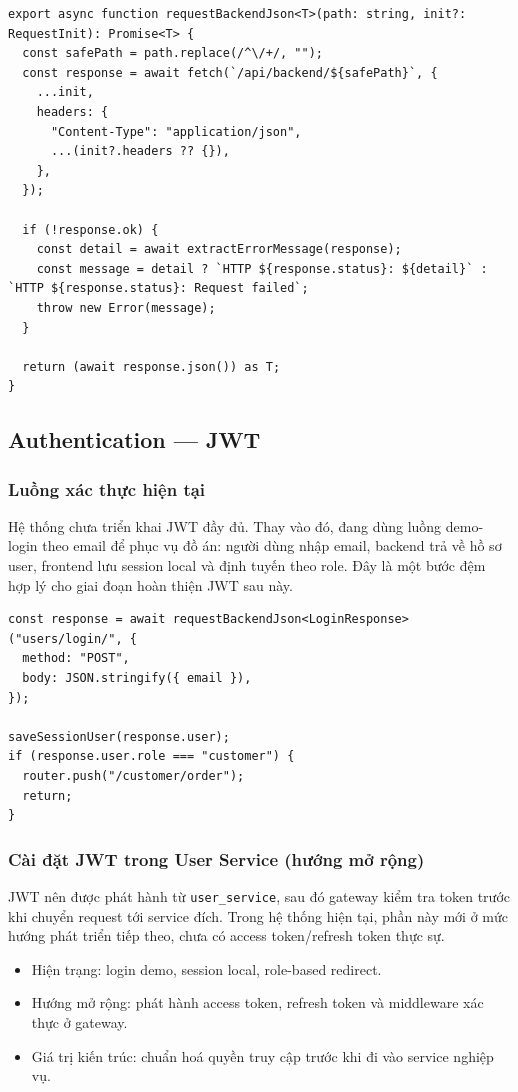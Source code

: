 \documentclass[12pt,a4paper]{article}
\begin{document}
\begin{lstlisting}[style=code,caption={Helper gọi backend từ frontend}]
export async function requestBackendJson<T>(path: string, init?: RequestInit): Promise<T> {
  const safePath = path.replace(/^\/+/, "");
  const response = await fetch(`/api/backend/${safePath}`, {
    ...init,
    headers: {
      "Content-Type": "application/json",
      ...(init?.headers ?? {}),
    },
  });

  if (!response.ok) {
    const detail = await extractErrorMessage(response);
    const message = detail ? `HTTP ${response.status}: ${detail}` : `HTTP ${response.status}: Request failed`;
    throw new Error(message);
  }

  return (await response.json()) as T;
}
\end{lstlisting}

\subsection{Authentication --- JWT}
\subsubsection{Luồng xác thực hiện tại}
Hệ thống chưa triển khai JWT đầy đủ. Thay vào đó, đang dùng luồng demo-login theo email để phục vụ đồ án: người dùng nhập email, backend trả về hồ sơ user, frontend lưu session local và định tuyến theo role. Đây là một bước đệm hợp lý cho giai đoạn hoàn thiện JWT sau này.

\begin{lstlisting}[style=code,caption={Luồng login demo theo email ở frontend}]
const response = await requestBackendJson<LoginResponse>("users/login/", {
  method: "POST",
  body: JSON.stringify({ email }),
});

saveSessionUser(response.user);
if (response.user.role === "customer") {
  router.push("/customer/order");
  return;
}
\end{lstlisting}

\subsubsection{Cài đặt JWT trong User Service (hướng mở rộng)}
JWT nên được phát hành từ \texttt{user\_service}, sau đó gateway kiểm tra token trước khi chuyển request tới service đích. Trong hệ thống hiện tại, phần này mới ở mức hướng phát triển tiếp theo, chưa có access token/refresh token thực sự.

\begin{itemize}
  \item Hiện trạng: login demo, session local, role-based redirect.
  \item Hướng mở rộng: phát hành access token, refresh token và middleware xác thực ở gateway.
  \item Giá trị kiến trúc: chuẩn hoá quyền truy cập trước khi đi vào service nghiệp vụ.
\end{itemize}
\end{document}
